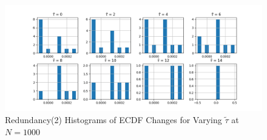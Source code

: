 \begin{figure}
    \centering
    \includegraphics[width=0.8\linewidth]{redtau}
    \caption{Redundancy(2) Histograms of ECDF Changes for Varying $\tilde \tau$ at $N=1000$}
    \label{fig:taus}
\end{figure}

